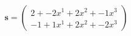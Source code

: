 \documentclass[preview]{standalone}
\begin{document}
\begin{align*}
\mathbf{s} = \begin{pmatrix}2 + -2x^{1} + 2x^{2} + -1x^{3} \\ -1 + 1x^{1} + 2x^{2} + -2x^{3}\end{pmatrix}
\end{align*}
\end{document}
